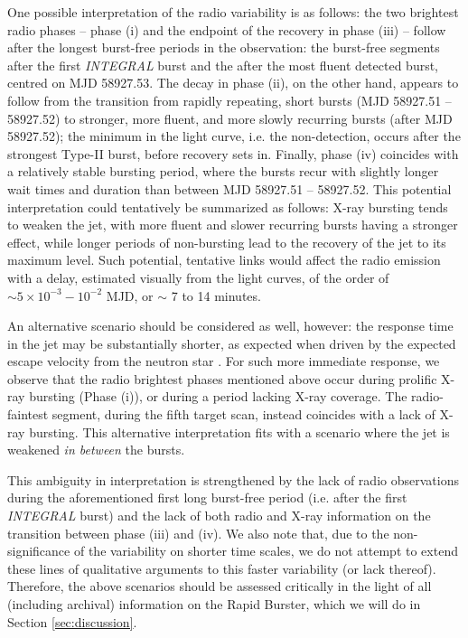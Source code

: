 \documentclass[fleqn,usenatbib]{mnras}
\begin{document}
One possible interpretation of the radio variability is as follows: the two brightest radio phases -- phase (i) and the endpoint of the recovery in phase (iii) -- follow after the longest burst-free periods in the observation: the burst-free segments after the first \textit{INTEGRAL} burst and the after the most fluent detected burst, centred on MJD 58927.53. The decay in phase (ii), on the other hand, appears to follow from the transition from rapidly repeating, short bursts (MJD 58927.51 -- 58927.52) to stronger, more fluent, and more slowly recurring bursts (after MJD 58927.52); the minimum in the light curve, i.e. the non-detection, occurs after the strongest Type-II burst, before recovery sets in. Finally, phase (iv) coincides with a relatively stable bursting period, where the bursts recur with slightly longer wait times and duration than between MJD 58927.51 -- 58927.52. This potential interpretation could tentatively be summarized as follows: X-ray bursting tends to weaken the jet, with more fluent and slower recurring bursts having a stronger effect, while longer periods of non-bursting lead to the recovery of the jet to its maximum level. Such potential, tentative links would affect the radio emission with a delay, estimated visually from the light curves, of the order of $\sim 5\times10^{-3} - 10^{-2}$ MJD, or $\sim$ 7 to 14 minutes. 

An alternative scenario should be considered as well, however: the response time in the jet may be substantially shorter, as expected when driven by the expected escape velocity from the neutron star \citep[e.g., $\sim 3$ minutes, as seen in response to Type-I bursts in 4U 1728-34 by][]{russell2024}. For such more immediate response, we observe that the radio brightest phases mentioned above occur during prolific X-ray bursting (Phase (i)), or during a period lacking X-ray coverage. The radio-faintest segment, during the fifth target scan, instead coincides with a lack of X-ray bursting. This alternative interpretation fits with a scenario where the jet is weakened \textit{in between} the bursts.

This ambiguity in interpretation is strengthened by the lack of radio observations during the aforementioned first long burst-free period (i.e. after the first \textit{INTEGRAL} burst) and the lack of both radio and X-ray information on the transition between phase (iii) and (iv). We also note that, due to the non-significance of the variability on shorter time scales, we do not attempt to extend these lines of qualitative arguments to this faster variability (or lack thereof). Therefore, the above scenarios should be assessed critically in the light of all (including archival) information on the Rapid Burster, which we will do in Section \ref{sec:discussion}. 
\end{document}

